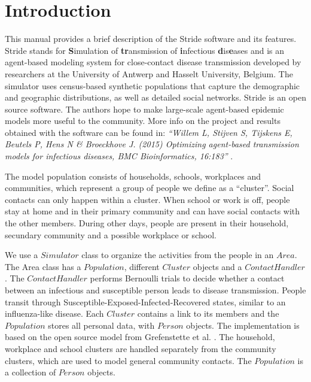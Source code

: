 \chapter{Introduction}
\label{chap:Introduction}
  
This manual provides a brief description of the Stride software and its
features. 
Stride stands for \textbf{S}imulation of \textbf{tr}ansmission 
 of \textbf{i}nfectious \textbf{d}is\textbf{e}ases and is an agent-based modeling 
system for close-contact disease transmission developed by researchers at the
University of Antwerp and Hasselt University, Belgium.
The simulator uses census-based synthetic populations
that capture the demographic and geographic distributions, as well as detailed social networks.
Stride is an open source software. The authors hope to make large-scale
agent-based epidemic models more useful to the community.
More info on the project and results obtained with the software
can be found in: 
\textit{``Willem L, Stijven S, Tijskens E, Beutels P, Hens N \& Broeckhove J. (2015) Optimizing agent-based transmission models for infectious diseases, BMC Bioinformatics, 16:183''} \cite{willem2015}.

The model population consists of households, schools, workplaces and
communities, which represent a group of people we define as a ``cluster''.
Social contacts can only happen within a cluster. 
When school or work is off, people stay at home and in their primary
community and can have social contacts with the other members.
During other days, people are present in their household, secundary community
and a possible workplace or school.  



We use a $Simulator$ class to organize the activities from the people in an $Area$. 
The Area class has a $Population$, different $Cluster$ objects and a $Contact
Handler$.
The $Contact Handler$ performs Bernoulli trials to decide whether a contact
between an infectious and susceptible person leads to disease transmission. 
People transit through Susceptible-Exposed-Infected-Recovered states,
similar to an influenza-like disease.
Each $Cluster$ contains a link to its members and the $Population$ stores all personal
data, with $Person$ objects.
The implementation is based on the open source model from Grefenstette et al. \cite{grefenstette2013}. 
The household, workplace and school clusters are handled separately from the
community clusters, which are used to model general community contacts. The
$Population$ is a collection of $Person$ objects.

